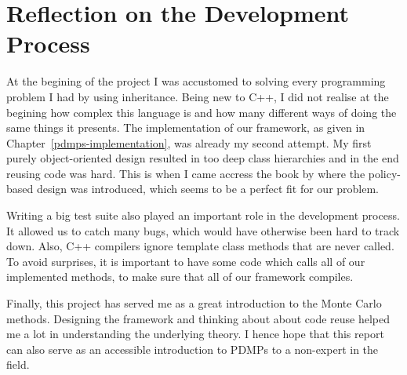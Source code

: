 \documentclass[report.tex]{subfiles}
\begin{document}
\section{Reflection on the Development Process}

At the begining of the project I was accustomed to solving every programming problem I had
by using inheritance.
Being new to C++, I did not realise at the begining how complex this language is and
how many different ways of doing the same things it presents.
The implementation of our framework, as given in Chapter~\ref{pdmps-implementation},
was already my second attempt.
My first purely object-oriented design resulted in too deep class hierarchies
and in the end reusing code was hard.
This is when I came accress the book by \citet{alexandrescu2001modern}
where the policy-based design was introduced, which seems to be a perfect
fit for our problem.

Writing a big test suite also played an important role in the development process.
It allowed us to catch many bugs, which would have otherwise been hard to track down.
Also, C++ compilers ignore template class methods that are never called.
To avoid surprises, it is important to have some code which calls all of our implemented
methods, to make sure that all of our framework compiles.

Finally, this project has served me as a great introduction to the Monte Carlo methods.
Designing the framework and thinking about about code reuse helped me a lot in
understanding the underlying theory.
I hence hope that this report can also serve as an accessible introduction to
PDMPs to a non-expert in the field.
\end{document}

